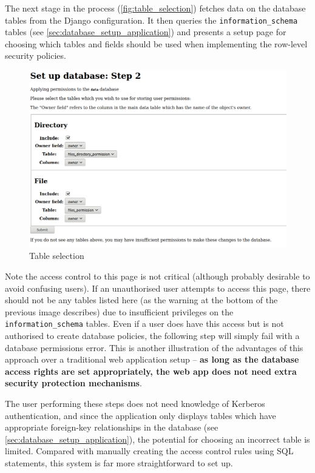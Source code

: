 \documentclass[12pt]{report}
\begin{document}
The next stage in the process (\autoref{fig:table_selection}) fetches data on the database tables from the Django configuration. It then queries the \verb+information_schema+ tables (see \autoref{sec:database_setup_application}) and presents a setup page for choosing which tables and fields should be used when implementing the row-level security policies.

\begin{figure}[h]
  \begin{center}
    \includegraphics[width=\textwidth]{03-setup2.png}
  \end{center}
  \caption{Table selection}
  \label{fig:table_selection}
\end{figure}

Note the access control to this page is not critical (although probably desirable to avoid confusing users). If an unauthorised user attempts to access this page, there should not be any tables listed here (as the warning at the bottom of the previous image describes) due to insufficient privileges on the \verb+information_schema+ tables. Even if a user does have this access but is not authorised to create database policies, the following step will simply fail with a database permissions error. This is another illustration of the advantages of this approach over a traditional web application setup -- \textbf{as long as the database access rights are set appropriately, the web app does not need extra security protection mechanisms}.

The user performing these steps does not need knowledge of Kerberos authentication, and since the application only displays tables which have appropriate foreign-key relationships in the database (see \autoref{sec:database_setup_application}), the potential for choosing an incorrect table is limited. Compared with manually creating the access control rules using SQL statements, this system is far more straightforward to set up.
\end{document}
